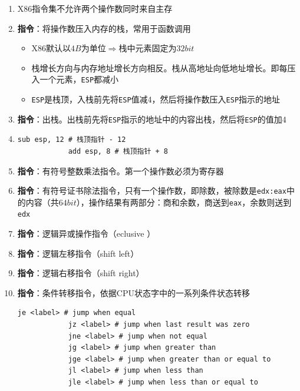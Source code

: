 \documentclass[./computer-organization-and-architecture.tex]{subfiles}
\begin{document}
    \begin{enumerate}
        \item X86指令集不允许两个操作数同时来自主存
        \item \textbf{指令}：将操作数压入内存的栈，常用于函数调用
        \begin{itemize}
            \item X86默认以$4B$为单位$\Rightarrow$栈中元素固定为$32bit$
            \item 栈增长方向与内存地址增长方向相反。栈从高地址向低地址增长。即每压入一个元素，\texttt{ESP}都减小
            \item \texttt{ESP}是栈顶，入栈前先将\texttt{ESP}值减4，然后将操作数压入\texttt{ESP}指示的地址
        \end{itemize}
        \item \textbf{指令}：出栈。出栈前先将\texttt{ESP}指示的地址中的内容出栈，然后将\texttt{ESP}的值加4
        \item \leavevmode
        \begin{lstlisting}[language={[x86masm]Assembler}]
            sub esp, 12 # 栈顶指针 - 12
            add esp, 8 # 栈顶指针 + 8
        \end{lstlisting}
        \item \textbf{指令}：有符号整数乘法指令。第一个操作数必须为寄存器
        \item \textbf{指令}：有符号证书除法指令，只有一个操作数，即除数，被除数是\texttt{edx:eax}中的内容（共$64bit$），操作结果有两部分：商和余数，商送到\texttt{eax}，余数则送到\texttt{edx}
        \item \textbf{指令}：逻辑异或操作指令（e{\color{red}{x}}clusive {\color{red}{or}}）
        \item \textbf{指令}：逻辑左移指令（shift left）
        \item \textbf{指令}：逻辑右移指令（shift right）
        \item \textbf{指令}：条件转移指令，依据CPU状态字中的一系列条件状态转移
        \begin{lstlisting}[language={[x86masm]Assembler}]
            je <label> # jump when equal
            jz <label> # jump when last result was zero
            jne <label> # jump when not equal
            jg <label> # jump when greater than
            jge <label> # jump when greater than or equal to
            jl <label> # jump when less than
            jle <label> # jump when less than or equal to
        \end{lstlisting}

\end{enumerate}
\end{document}
